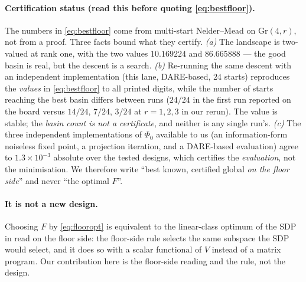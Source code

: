 \paragraph{Certification status (read this before quoting \eqref{eq:bestfloor}).}
The numbers in \eqref{eq:bestfloor} come from multi-start Nelder--Mead on
$\mathrm{Gr}(4,r)$, not from a proof. Three facts bound what they certify.
\emph{(a)} The landscape is two-valued at rank one, with the two values
$10.169224$ and $86.665888$ --- the good basin is real, but the descent is a
search.
\emph{(b)} Re-running the same descent with an independent implementation (this
lane, DARE-based, $24$ starts) reproduces the \emph{values} in
\eqref{eq:bestfloor} to all printed digits, while the number of starts reaching
the best basin differs between runs ($24/24$ in the first run reported on the
board versus $14/24$, $7/24$, $3/24$ at $r=1,2,3$ in our rerun). The value is
stable; the \emph{basin count is not a certificate}, and neither is any single
run's.
\emph{(c)} The three independent implementations of $\Phi_0$ available to us
(an information-form noiseless fixed point, a projection iteration, and a
DARE-based evaluation) agree to $1.3\times10^{-3}$ absolute over the tested
designs, which certifies the \emph{evaluation}, not the minimisation.
We therefore write ``best known, certified global \emph{on the floor side}'' and
never ``the optimal $F$''.

\paragraph{It is not a new design.} Choosing $F$ by \eqref{eq:flooropt} is
equivalent to the linear-class optimum of the SDP in \cite{tanaka2015joint} read
on the floor side: the floor-side rule selects the same subspace the SDP would
select, and it does so with a scalar functional of $V$ instead of a matrix
program. Our contribution here is the floor-side reading and the rule, not the
design.

